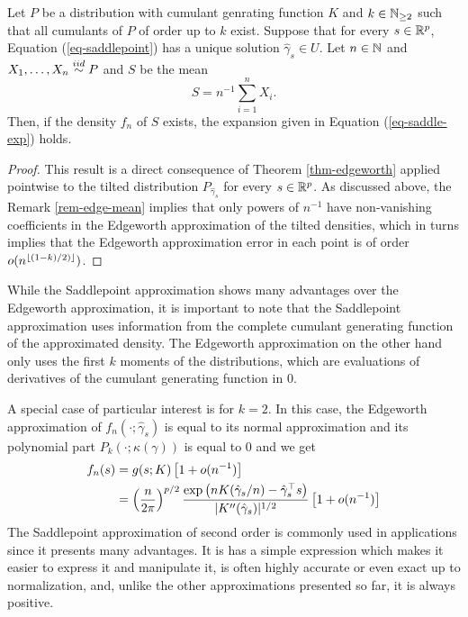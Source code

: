 \begin{theorem}
    Let $P$ be a distribution with cumulant genrating function $K$ and $k \in \mathbb{N}_{\geq 2}$ such that all cumulants of $P$ of order up to $k$ exist. Suppose that for every $s \in {\mathbb{R}^p}$, Equation (\ref{eq-saddlepoint}) has a unique solution $\hat\gamma_s \in U$. Let $n \in \mathbb{N}$ and $X_1, \ldots, X_n \stackrel{iid}{\sim} P$ and $S$ be the mean
    \begin{equation*}
        S = n^{-1} \sum_{i=1}^n X_i.
    \end{equation*}
    Then, if the density $f_n$ of $S$ exists, the expansion given in Equation (\ref{eq-saddle-exp}) holds.
\end{theorem}
\begin{proof}
    This result is a direct consequence of Theorem \ref{thm-edgeworth} applied pointwise to the tilted distribution $P_{\hat\gamma_s}$ for every $s \in {\mathbb{R}^p}$. As discussed above, the Remark \ref{rem-edge-mean} implies that only powers of $n^{-1}$ have non-vanishing coefficients in the Edgeworth approximation of the tilted densities, which in turns implies that the Edgeworth approximation error in each point is of order $o(n^{\lfloor(1-k)/2)\rfloor})$.
\end{proof}

While the Saddlepoint approximation shows many advantages over the Edgeworth approximation, it is important to note that the Saddlepoint approximation uses information from the complete cumulant generating function of the approximated density. The Edgeworth approximation on the other hand only uses the first $k$ moments of the distributions, which are evaluations of derivatives of the cumulant generating function in 0. 

A special case of particular interest is for $k = 2$. In this case, the Edgeworth approximation of $f_n(\cdot; \hat\gamma_s)$ is equal to its normal approximation and its polynomial part $P_k(\cdot; \kappa(\gamma))$ is equal to 0 and we get 
\begin{align} \label{eq-saddle-3}
    f_n(s) &= g(s; K)\left[1 + o(n^{-1})\right]\nonumber\\
    &= \left(\frac{n}{2\pi}\right)^{p/2} \frac{\exp\left(nK(\hat\gamma_s / n) - \hat\gamma_s^\top s\right)}{|K''(\hat\gamma_s)|^{1/2}} \left[1 + o(n^{-1})\right]
\end{align}
The Saddlepoint approximation of second order is commonly used in applications since it presents many advantages. It is has a simple expression which makes it easier to express it and manipulate it, is often highly accurate or even exact up to normalization, and, unlike the other approximations presented so far, it is always positive.

